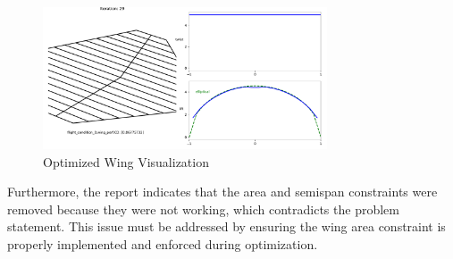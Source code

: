 \documentclass{article}
\begin{document}
\begin{figure}[h!]
    \centering
    \includegraphics[width=0.75\textwidth]{Figures/Optimized_Wing.pdf}
    \caption{Optimized Wing Visualization}
    \label{fig:OptimizedWing}
\end{figure}

Furthermore, the report indicates that the area and semispan constraints were removed because they were not working, which contradicts the problem statement. This issue must be addressed by ensuring the wing area constraint is properly implemented and enforced during optimization.
\end{document}
